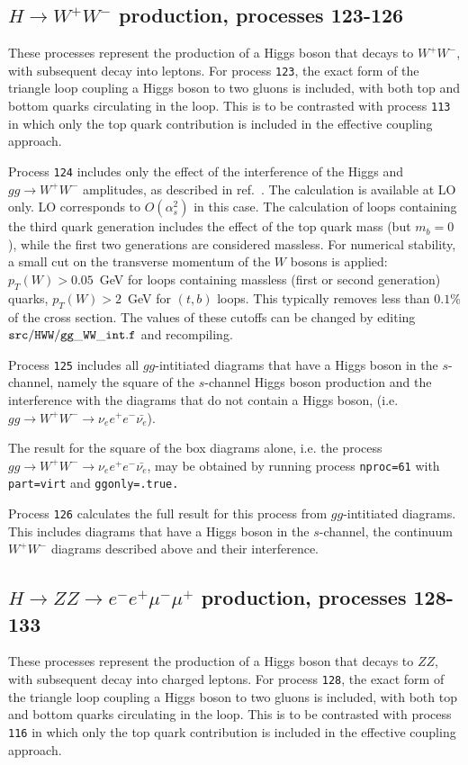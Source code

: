 \subsection{$H \to W^+W^-$ production, processes 123-126}
These processes represent the production of a Higgs boson that decays to $W^+ W^-$,
with subsequent decay into leptons. For process {\tt 123}, the exact form of the triangle
loop coupling a Higgs boson to two gluons is included, with both top and bottom quarks
circulating in the loop. This is to be contrasted with process {\tt 113} in which only the
top quark contribution is included in the effective coupling approach.

Process {\tt 124} includes only the effect of the interference of the
Higgs and $gg \to W^+W^-$ amplitudes, as described in ref.~\cite{Campbell:2011cu}.
The calculation is available at LO only. LO corresponds to $O(\alpha_s^2)$ in this case.
The calculation of loops containing the third quark generation
includes the effect of the top quark mass (but $m_b=0$), while the first two
generations are considered massless. For numerical stability, a small cut on the
transverse momentum of the $W$ bosons is applied: $p_T(W)>0.05$~GeV for loops
containing massless (first or second generation) quarks, $p_T(W)>2$~GeV for $(t,b)$
loops. This typically removes less than $0.1$\% of the cross section. The
values of these cutoffs can be changed by editing ${\tt src/HWW/gg\_WW\_int.f}$ and recompiling.

Process {\tt 125} includes all $gg$-intitiated diagrams that have a Higgs boson in the $s$-channel,
namely the square of the $s$-channel Higgs boson production and the interference with the diagrams
that do not contain a Higgs boson, (i.e. $gg \to W^+W^- \to \nu_e e^+ e^- \bar{\nu_e}$).

The result for the square of the box diagrams alone, i.e. the process
$gg \to W^+W^- \to \nu_e e^+ e^- \bar{\nu_e}$, may be obtained by running process
{\tt nproc=61} with {\tt part=virt} and {\tt ggonly=.true.} 

Process {\tt 126} calculates the full result for this process from  $gg$-intitiated diagrams.
This includes diagrams that have a Higgs boson in the $s$-channel, the continuum $W^+W^-$
diagrams described above and their interference. 


\subsection{$H \to ZZ \to e^- e^+ \mu^- \mu^+$ production, processes 128-133}
These processes represent the production of a Higgs boson that decays to $Z Z$,
with subsequent decay into charged leptons. For process {\tt 128}, the exact form of the triangle
loop coupling a Higgs boson to two gluons is included, with both top and bottom quarks
circulating in the loop. This is to be contrasted with process {\tt 116} in which only the
top quark contribution is included in the effective coupling approach.

